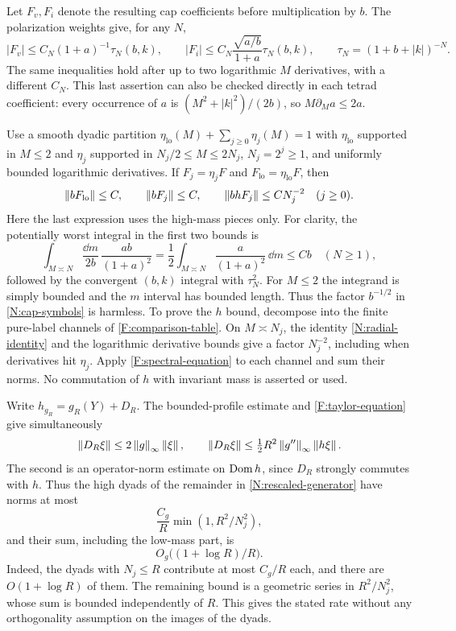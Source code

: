 Let $F_v,F_i$ denote the resulting cap coefficients before
multiplication by $b$.  The polarization weights give, for any $N$,
\begin{equation}\label{N:cap-symbols}
 |F_v|\leq C_N(1+a)^{-1}\tau_N(b,k),\qquad
 |F_i|\leq C_N\frac{\sqrt{a/b}}{1+a}\tau_N(b,k),\qquad
 \tau_N=(1+b+|k|)^{-N}.
\end{equation}
The same inequalities hold after up to two logarithmic $M$
derivatives, with a different $C_N$.  This last assertion can also
be checked directly in each tetrad coefficient: every occurrence
of $a$ is $(M^2+|k|^2)/(2b)$, so $M\partial_Ma\leq2a$.

Use a smooth dyadic partition $\eta_{\mathrm{lo}}(M)+\sum_{j\geq0}\eta_j(M)=1$
with $\eta_{\mathrm{lo}}$ supported in $M\leq2$ and
$\eta_j$ supported in $N_j/2\leq M\leq2N_j$, $N_j=2^j\geq1$,
and uniformly bounded logarithmic derivatives.  If $F_j=\eta_jF$
and $F_{\mathrm{lo}}=\eta_{\mathrm{lo}}F$, then
\begin{equation}\label{N:cap-dyads}
 \left\lVert bF_{\mathrm{lo}}\right\rVert\leq C,\qquad
 \left\lVert bF_j\right\rVert\leq C,\qquad
 \left\lVert bhF_j\right\rVert\leq C N_j^{-2}\quad(j\geq0).
\end{equation}
Here the last expression uses the high-mass pieces only.  For clarity,
the potentially worst integral in the first two bounds is
\[
 \int_{M\asymp N}\frac{\dd m}{2b}\,
       \frac{ab}{(1+a)^2}
 =\frac12\int_{M\asymp N}\frac{a}{(1+a)^2}\,\dd m
 \leq Cb\quad(N\geq1),
\]
followed by the convergent $(b,k)$ integral with $\tau_N^2$.
For $M\leq2$ the integrand is simply bounded and the $m$ interval
has bounded length.  Thus the factor $b^{-1/2}$ in
\eqref{N:cap-symbols} is harmless.  To prove the $h$ bound, decompose
into the finite pure-label channels of
\eqref{F:comparison-table}.  On $M\asymp N_j$, the identity
\eqref{N:radial-identity} and the logarithmic derivative bounds give
a factor $N_j^{-2}$, including when derivatives hit $\eta_j$.
Apply \eqref{F:spectral-equation} to each channel and sum their
norms.  No commutation of $h$ with invariant mass is asserted or used.

Write $h_{g_R}=g_R(Y)+D_R$.  The bounded-profile estimate and
\eqref{F:taylor-equation} give simultaneously
\[
 \left\lVert D_R\xi\right\rVert\leq2\left\lVert g\right\rVert_\infty\left\lVert\xi\right\rVert,\qquad
 \left\lVert D_R\xi\right\rVert\leq\tfrac12R^2\left\lVert g''\right\rVert_\infty\left\lVert h\xi\right\rVert.
\]
The second is an operator-norm estimate on $\operatorname{Dom} h$, since $D_R$
strongly commutes with $h$.  Thus the high dyads of the remainder
in \eqref{N:rescaled-generator} have norms at most
\[
 \frac{C_g}{R}\min(1,R^2/N_j^2),
\]
and their sum, including the low-mass part, is
\begin{equation}\label{N:cap-remainder}
 O_g\bigl((1+\log R)/R\bigr).
\end{equation}
Indeed, the dyads with $N_j\leq R$ contribute at most
$C_g/R$ each, and there are $O(1+\log R)$ of them. The remaining
bound is a geometric series in $R^2/N_j^2$, whose sum is bounded
independently of $R$. This gives the stated rate without any
orthogonality assumption on the images of the dyads.

